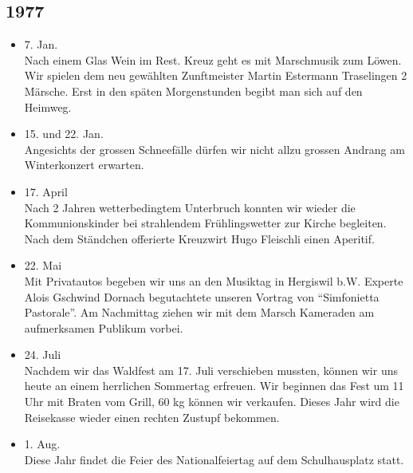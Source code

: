 \subsection*{1977}

\begin{history}


    \begin{itemize}

        \item 7. Jan.\\
              Nach einem Glas Wein im Rest. Kreuz geht es mit Marschmusik zum Löwen.
              Wir spielen dem neu gewählten Zunftmeister Martin Estermann Traselingen
              2 Märsche. Erst in den späten Morgenstunden begibt man sich auf den
              Heimweg.

        \item 15. und 22. Jan.\\
              Angesichts der grossen Schneefälle dürfen wir nicht allzu grossen
              Andrang am Winterkonzert erwarten.

        \item 17. April\\
              Nach 2 Jahren wetterbedingtem Unterbruch konnten wir wieder die
              Kommunionskinder bei strahlendem Frühlingswetter zur Kirche begleiten.
              Nach dem Ständchen offerierte Kreuzwirt Hugo Fleischli einen Aperitif.

        \item 22. Mai\\
              Mit Privatautos begeben wir uns an den Musiktag in Hergiswil b.W.
              Experte Alois Gschwind Dornach begutachtete unseren Vortrag von
              \enquote{Simfonietta Pastorale}. Am Nachmittag ziehen wir mit dem Marsch
              Kameraden am aufmerksamen Publikum vorbei.

        \item 24. Juli\\
              Nachdem wir das Waldfest am 17. Juli verschieben mussten, können wir uns
              heute an einem herrlichen Sommertag erfreuen. Wir beginnen das Fest um
              11 Uhr mit Braten vom Grill, 60 kg können wir verkaufen. Dieses Jahr
              wird die Reisekasse wieder einen rechten Zustupf bekommen.

        \item 1. Aug.\\
              Diese Jahr findet die Feier des Nationalfeiertag auf dem Schulhausplatz
              statt.


\end{itemize}
\end{history}

